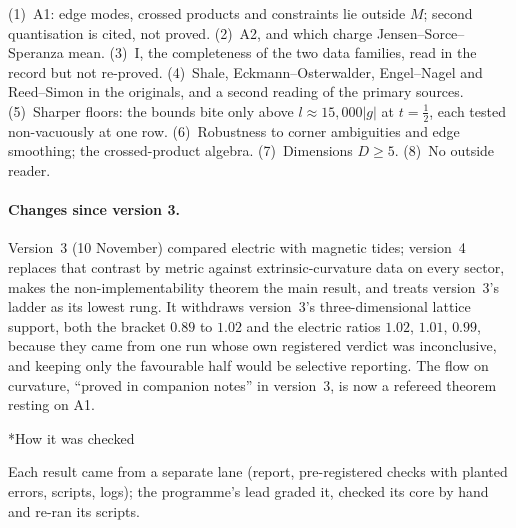\documentclass[11pt]{article}
\makeatletter
\renewcommand\section{\@startsection{section}{1}{\z@}{-2.4ex \@plus -1ex \@minus -.2ex}{1.2ex \@plus .2ex}{\normalfont\Large\bfseries}}
\makeatother
\begin{document}
\section{Open items}\label{sec:open}

(1)~A1: edge modes, crossed products and constraints lie outside $M$; second quantisation is cited, not proved. (2)~A2, and which charge Jensen--Sorce--Speranza mean. (3)~I, the completeness of the two data families, read in the record but not re-proved. (4)~Shale, Eckmann--Osterwalder, Engel--Nagel and Reed--Simon in the originals, and a second reading of the primary sources. (5)~Sharper floors: the bounds bite only above $l\approx15{,}000|g|$ at $t=\frac12$, each tested non-vacuously at one row. (6)~Robustness to corner ambiguities and edge smoothing; the crossed-product algebra. (7)~Dimensions $D\ge5$. (8)~No outside reader.

\paragraph{Changes since version 3.} Version~3 (10 November) compared electric with magnetic tides; version~4 replaces that contrast by metric against extrinsic-curvature data on every sector, makes the non-implementability theorem the main result, and treats version~3's ladder as its lowest rung. It withdraws version~3's three-dimensional lattice support, both the bracket $0.89$ to $1.02$ and the electric ratios $1.02$, $1.01$, $0.99$, because they came from one run whose own registered verdict was inconclusive, and keeping only the favourable half would be selective reporting. The flow on curvature, ``proved in companion notes'' in version~3, is now a refereed theorem resting on A1.

\section*{How it was checked}

Each result came from a separate lane (report, pre-registered checks with planted errors, scripts, logs); the programme's lead graded it, checked its core by hand and re-ran its scripts.
\end{document}
